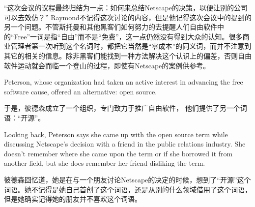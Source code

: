\ifdefined\chs
“这次会议的议程最终归结为一点：如何来总结Netscape的决策，以便让别的公司可以去效仿？” Raymond不记得这次讨论的内容，但是他记得这次会议中的提到的另一个问题。不管斯托曼和其他黑客们如何努力的去提醒人们自由软件中的“Free”一词是指“自由”而不是“免费”，这一点仍然没有得到大众的认知。很多商业管理者第一次听到这个名词时，都把它当然是“零成本”的同义词，而并不注意到其它的相关的信息。除非黑客们能找到一种方法解决这个认识上的偏差，否则自由软件运动就会而临一个登山的过程，即使有Netscape的案例供参考。
\fi



\ifdefined\eng
Peterson, whose organization had taken an active interest in advancing the free software cause, offered an alternative: open source.
\fi

\ifdefined\chs
于是，彼德森成立了一个组织，专门致力于推广自由软件， 他们提供了另一个词语：“开源”。
\fi

\ifdefined\eng
Looking back, Peterson says she came up with the open source term while discussing Netscape's decision with a friend in the public relations industry. She doesn't remember where she came upon the term or if she borrowed it from another field, but she does remember her friend disliking the term.
\fi

\ifdefined\chs
彼德森回忆道，她是在与一个朋友讨论Netscape的决定的时候，想到了“开源”这个词语。她不记得是她自己首创了这个词语，还是从别的什么领域借用了这个词语，但是她确实记得她的朋友并不喜欢这个词语。
\fi

